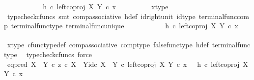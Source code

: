 \begin{isabellebody}
\ \ \ \ \ \ \isamarkupfalse%
\ \isamarkupfalse%
\ {\isachardoublequoteopen}{\isachardot}{\kern0pt}{\isachardot}{\kern0pt}{\isachardot}{\kern0pt}\ {\isacharequal}{\kern0pt}\ h\ {\isasymcirc}\isactrlsub c\ {\isacharparenleft}{\kern0pt}left{\isacharunderscore}{\kern0pt}coproj\ X\ Y\ {\isasymcirc}\isactrlsub c\ x{\isacharparenright}{\kern0pt}{\isachardoublequoteclose}\isanewline
\ \ \ \ \ \ \ \ \isamarkupfalse%
\ x{\isacharunderscore}{\kern0pt}type\ \isamarkupfalse%
\ {\isacharparenleft}{\kern0pt}typecheck{\isacharunderscore}{\kern0pt}cfuncs{\isacharcomma}{\kern0pt}\ smt\ comp{\isacharunderscore}{\kern0pt}associative{}\ h{\isacharunderscore}{\kern0pt}def\ id{\isacharunderscore}{\kern0pt}right{\isacharunderscore}{\kern0pt}unit{}\ id{\isacharunderscore}{\kern0pt}type\ terminal{\isacharunderscore}{\kern0pt}func{\isacharunderscore}{\kern0pt}comp\ terminal{\isacharunderscore}{\kern0pt}func{\isacharunderscore}{\kern0pt}type\ terminal{\isacharunderscore}{\kern0pt}func{\isacharunderscore}{\kern0pt}unique{\isacharparenright}{\kern0pt}\isanewline
\ \ \ \ \ \ \isamarkupfalse%
\ \isamarkupfalse%
\ {\isachardoublequoteopen}{\isachardot}{\kern0pt}{\isachardot}{\kern0pt}{\isachardot}{\kern0pt}\ {\isacharequal}{\kern0pt}\ {\isacharparenleft}{\kern0pt}h\ {\isasymcirc}\isactrlsub c\ left{\isacharunderscore}{\kern0pt}coproj\ X\ Y{\isacharparenright}{\kern0pt}\ {\isasymcirc}\isactrlsub c\ x{\isachardoublequoteclose}\isanewline
\ \ \ \ \ \ \ \ \ \ \ \ \ \isamarkupfalse%
\ x{\isacharunderscore}{\kern0pt}type\ cfunc{\isacharunderscore}{\kern0pt}type{\isacharunderscore}{\kern0pt}def\ comp{\isacharunderscore}{\kern0pt}associative\ comp{\isacharunderscore}{\kern0pt}type\ false{\isacharunderscore}{\kern0pt}func{\isacharunderscore}{\kern0pt}type\ h{\isacharunderscore}{\kern0pt}def\ terminal{\isacharunderscore}{\kern0pt}func{\isacharunderscore}{\kern0pt}type\ \isamarkupfalse%
\ {\isacharparenleft}{\kern0pt}typecheck{\isacharunderscore}{\kern0pt}cfuncs{\isacharcomma}{\kern0pt}\ force{\isacharparenright}{\kern0pt}\isanewline
\ \ \ \ \ \ \isamarkupfalse%
\ \isamarkupfalse%
\ {\isachardoublequoteopen}{\isacharparenleft}{\kern0pt}{\isacharparenleft}{\kern0pt}eq{\isacharunderscore}{\kern0pt}pred\ {\isacharparenleft}{\kern0pt}X\ {\isasymCoprod}\ Y{\isacharparenright}{\kern0pt}\ {\isasymcirc}\isactrlsub c\ {\isasymlangle}z\ {\isasymcirc}\isactrlsub c\ {\isasymbeta}\isactrlbsub X\ {\isasymCoprod}\ Y\isactrlesub {\isacharcomma}{\kern0pt}id\isactrlsub c\ {\isacharparenleft}{\kern0pt}X\ {\isasymCoprod}\ Y{\isacharparenright}{\kern0pt}{\isasymrangle}{\isacharparenright}{\kern0pt}\ {\isasymcirc}\isactrlsub c\ left{\isacharunderscore}{\kern0pt}coproj\ X\ Y{\isacharparenright}{\kern0pt}\ {\isasymcirc}\isactrlsub c\ x\ \ {\isacharequal}{\kern0pt}\ {\isacharparenleft}{\kern0pt}h\ {\isasymcirc}\isactrlsub c\ left{\isacharunderscore}{\kern0pt}coproj\ X\ Y{\isacharparenright}{\kern0pt}\ {\isasymcirc}\isactrlsub c\ x{\isachardoublequoteclose}\isanewline

\end{isabellebody}

